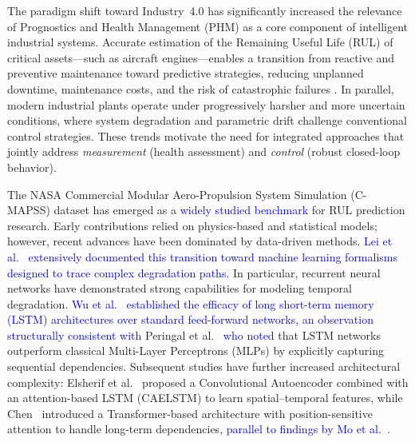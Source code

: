 \documentclass[12pt, a4paper]{article}
\begin{document}
The paradigm shift toward Industry~4.0 has significantly increased the relevance of Prognostics and Health Management (PHM) as a core component of intelligent industrial systems. Accurate estimation of the Remaining Useful Life (RUL) of critical assets—such as aircraft engines—enables a transition from reactive and preventive maintenance toward predictive strategies, reducing unplanned downtime, maintenance costs, and the risk of catastrophic failures \cite{Saxena2008}. In parallel, modern industrial plants operate under progressively harsher and more uncertain conditions, where system degradation and parametric drift challenge conventional control strategies. These trends motivate the need for integrated approaches that jointly address \emph{measurement} (health assessment) and \emph{control} (robust closed-loop behavior).

The NASA Commercial Modular Aero-Propulsion System Simulation (C-MAPSS) dataset has emerged as a \textcolor{blue}{widely studied benchmark \cite{Saxena2008}} for RUL prediction research. Early contributions relied on physics-based and statistical models; however, recent advances have been dominated by data-driven methods. \textcolor{blue}{Lei et al.~\cite{Lei2018Machinery} extensively documented this transition toward machine learning formalisms designed to trace complex degradation paths.} In particular, recurrent neural networks have demonstrated strong capabilities for modeling temporal degradation. \textcolor{blue}{Wu et al.~\cite{Wu2018Remaining} established the efficacy of long short-term memory (LSTM) architectures over standard feed-forward networks, an observation structurally consistent with} Peringal et al.~\cite{Peringal2024} \textcolor{blue}{who noted} that LSTM networks outperform classical Multi-Layer Perceptrons (MLPs) by explicitly capturing sequential dependencies. Subsequent studies have further increased architectural complexity: Elsherif et al.~\cite{Elsherif2025} proposed a Convolutional Autoencoder combined with an attention-based LSTM (CAELSTM) to learn spatial–temporal features, while Chen~\cite{Chen2024} introduced a Transformer-based architecture with position-sensitive attention to handle long-term dependencies\textcolor{blue}{, parallel to findings by Mo et al.~\cite{Mo2021Remaining}}.
\end{document}
